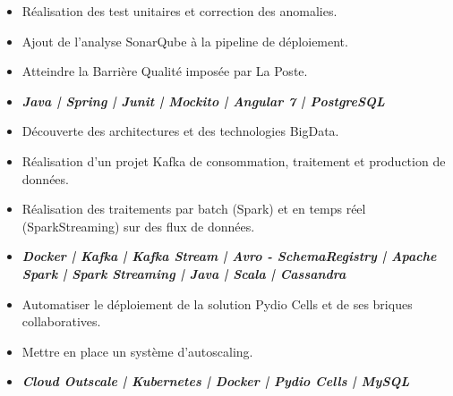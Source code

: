 \divider

\begin{itemize}
\item Réalisation des test unitaires et correction des anomalies.
\item Ajout de l'analyse SonarQube à la pipeline de déploiement.
\item Atteindre la Barrière Qualité imposée par La Poste.
\item \textbf {\emph{Java | Spring | Junit | Mockito | Angular 7 | PostgreSQL}}

\end{itemize}

\divider

\begin{itemize}
\item Découverte des architectures et des technologies BigData.
\item Réalisation d'un projet Kafka de consommation, traitement et production de données.
\item Réalisation des traitements par batch (Spark) et en temps réel (SparkStreaming) sur des flux de données.
\item \textbf {\emph{Docker | Kafka | Kafka Stream | Avro - SchemaRegistry | Apache Spark | Spark Streaming | Java | Scala | Cassandra}}
\end{itemize}

\divider

\begin{itemize}
\item Automatiser le déploiement de la solution Pydio Cells et de ses briques collaboratives.
\item Mettre en place un système d’autoscaling.
\item \textbf {\emph{Cloud Outscale | Kubernetes | Docker | Pydio Cells | MySQL}}
\end{itemize}


